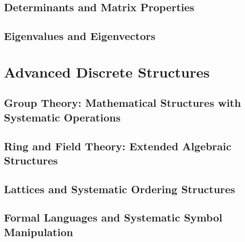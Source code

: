 \documentclass[12pt, oneside, openany]{book}
\begin{document}
\section{Determinants and Matrix Properties}

\section{Eigenvalues and Eigenvectors}


\chapter{Advanced Discrete Structures}

\section{Group Theory: Mathematical Structures with Systematic Operations}

\section{Ring and Field Theory: Extended Algebraic Structures}

\section{Lattices and Systematic Ordering Structures}

\section{Formal Languages and Systematic Symbol Manipulation}
\end{document}
